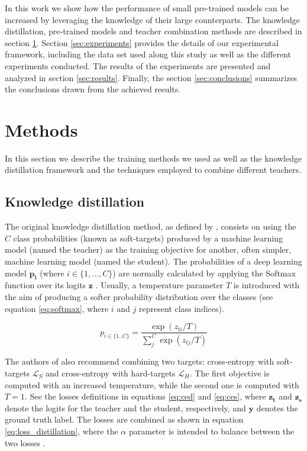 \documentclass{elsarticle}
\begin{document}
	In this work we show how the performance of small pre-trained models can be increased by leveraging the knowledge of their large counterparts. The knowledge distillation, pre-trained models and teacher combination methods are described in section  \ref{sec:methods}. Section \ref{sec:experiments} provides the details of our experimental framework, including the data set used along this study as well as the different experiments conducted. The results of the experiments are presented and analyzed in section \ref{sec:results}. Finally, the section \ref{sec:conclusions} summarizes the conclusions drawn from the achieved results.

	\section{Methods} \label{sec:methods}
	In this section we describe the training methods we used as well as the knowledge distillation framework and the techniques employed to combine different teachers.

	\subsection{Knowledge distillation} \label{sec:kd}
	The original knowledge distillation method, as defined by \citep{hinton2015}, consists on using the $C$ class probabilities (known as soft-targets) produced by a machine learning model (named the teacher) as the training objective for another, often simpler, machine learning model (named the student). The probabilities of a deep learning model $\mathbf{p_i}$ (where $i \in \{1,...,C\}$) are normally calculated by applying the Softmax function over its logits $\mathbf{z}$ \citep{goodfellow2016}. Usually, a temperature parameter $T$ is introduced with the aim of producing a softer probability distribution over the classes (see equation \ref{eq:softmax}, where $i$ and $j$ represent class indices).

	\begin{equation}
	p_{i \in \{1 .. C\}} = \frac{\exp(z_{ti}/T)}{\sum_j^C \exp(z_{tj}/T)}
	\label{eq:softmax}
	\end{equation}

	The authors of \citep{hinton2015} also recommend combining two targets: cross-entropy with soft-targets $\mathcal{L}_S$ and cross-entropy with hard-targets  $\mathcal{L}_H$. The first objective is computed with an increased temperature, while the second one is computed with $T=1$. See the losses definitions in equations \ref{eq:ced} and \ref{eq:ces}, where $\mathbf{z_t}$ and $\mathbf{z_s}$ denote the logits for the teacher and the student, respectively, and $\mathbf{y}$ denotes the ground truth label. The losses are combined as shown in equation \ref{eq:loss_distillation}, where the $\alpha$ parameter is intended to balance between the two losses \citep{gou2020}.
\end{document}
